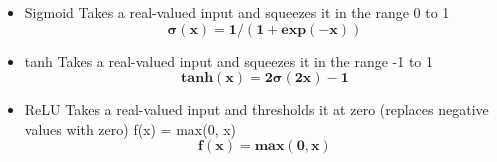 \begin{itemize}
\item Sigmoid \newline
Takes a real-valued input and squeezes it in the range 0 to 1
\begin{equation}
\mathbf{\sigma(x) = 1 / (1 + exp(-x))}
\end{equation}

\item tanh \newline
Takes a real-valued input and squeezes it in the range -1 to 1
\begin{equation}
\mathbf{tanh(x) = 2 \sigma (2x)-1}
\end{equation}

\item ReLU \newline
Takes a real-valued input and thresholds it at zero (replaces negative values with zero)
f(x) = max(0, x)
\begin{equation}
\mathbf{f(x) = max(0, x)}
\end{equation}
\end{itemize}

